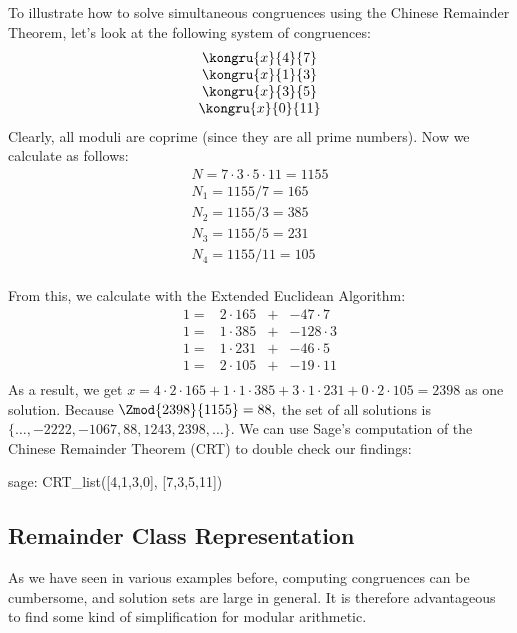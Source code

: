\begin{example} To illustrate how to solve simultaneous congruences using the Chinese Remainder Theorem, let's look at the following system of congruences:
$$
\begin{array}{c}
\kongru{x}{4}{7} \\
\kongru{x}{1}{3} \\
\kongru{x}{3}{5} \\
\kongru{x}{0}{11} \\
\end{array}
$$
Clearly, all moduli are coprime (since they are all prime numbers).  Now we calculate as follows: 
$$
\begin{array}{l}
N = 7 \cdot 3 \cdot 5 \cdot 11 = 1155\\
N_1 = 1155/7 = 165\\
N_2 = 1155/3 = 385\\
N_3 = 1155/5 = 231\\
N_4 = 1155/11 = 105\\
\end{array}
$$

From this, we calculate with the Extended Euclidean Algorithm:
$$
\begin{array}{cccc}
 1 = & 2 \cdot 165  & + & -47 \cdot 7 \\
 1 = & 1 \cdot 385  & + &  -128 \cdot 3 \\
 1 = & 1 \cdot 231  & + &  -46 \cdot 5 \\
 1 = & 2 \cdot 105  & + &  -19 \cdot 11 \\
\end{array}
$$
As a result, we get $x = 4 \cdot 2 \cdot 165 + 1 \cdot 1 \cdot 385 + 3 \cdot 1 \cdot 231 + 0 \cdot 2 \cdot 105 = 2398$
as one solution. Because $ \Zmod{2398}{1155} = 88, $ the set of all solutions is
$ \{\ldots, -2222, -1067,88,1243, 2398, \ldots \} $. We can use  Sage's computation of the Chinese Remainder Theorem (CRT) to double check our findings:
\begin{sagecommandline}
sage: CRT_list([4,1,3,0], [7,3,5,11])
\end{sagecommandline}
\end{example}

\subsection{Remainder Class Representation}
\label{def:remainder_class_representation}
As we have seen in various examples before, computing congruences can be cumbersome, and solution sets are large in general. It is therefore advantageous to find some kind of simplification for modular arithmetic.

